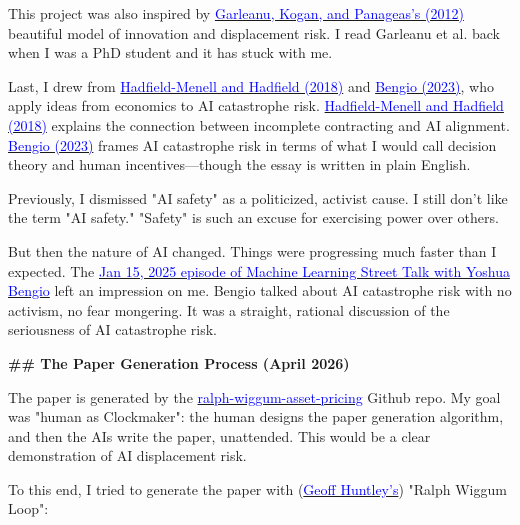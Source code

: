 \documentclass[12pt]{article}
\begin{document}
\begin{mdframed}[
linewidth=1pt,
linecolor=black,
innerleftmargin=0.25em,
innerrightmargin=0.25em,
innertopmargin=0.2\baselineskip,
innerbottommargin=0.8\baselineskip
]
This project was also inspired by \href{https://www.sciencedirect.com/science/article/abs/pii/S0304405X12000621}{\textcolor{blue}{Garleanu, Kogan, and Panageas's (2012)}} beautiful model of innovation and displacement risk. I read Garleanu et al. back when I was a PhD student and it has stuck with me.

Last, I drew from \href{https://arxiv.org/abs/1804.04268}{\textcolor{blue}{Hadfield-Menell and Hadfield (2018)}} and \href{https://www.journalofdemocracy.org/ai-and-catastrophic-risk/}{\textcolor{blue}{Bengio (2023)}}, who apply ideas from economics to AI catastrophe risk. \href{https://arxiv.org/abs/1804.04268}{\textcolor{blue}{Hadfield-Menell and Hadfield (2018)}} explains the connection between incomplete contracting and AI alignment. \href{https://www.journalofdemocracy.org/ai-and-catastrophic-risk/}{\textcolor{blue}{Bengio (2023)}} frames AI catastrophe risk in terms of what I would call decision theory and human incentives---though the essay is written in plain English.

Previously, I dismissed "AI safety" as a politicized, activist cause. I still don't like the term "AI safety." "Safety" is such an excuse for exercising power over others.

But then the nature of AI changed. Things were progressing much faster than I expected. The \href{https://podcasts.apple.com/ca/podcast/yoshua-bengio-designing-out-agency-for-safe-ai/id1510472996?i=1000684132955}{\textcolor{blue}{Jan 15, 2025 episode of Machine Learning Street Talk with Yoshua Bengio}} left an impression on me. Bengio talked about AI catastrophe risk with no activism, no fear mongering. It was a straight, rational discussion of the seriousness of AI catastrophe risk.

\par
{\large\bfseries \textcolor{red!70!black}{\#\# The Paper Generation Process (April 2026)}}
\par

The paper is generated by the \href{https://github.com/redacted/ralph-wiggum-asset-pricing/tree/main}{\textcolor{blue}{ralph-wiggum-asset-pricing}} Github repo. My goal was "human as Clockmaker": the human designs the paper generation algorithm, and then the AIs write the paper, unattended. This would be a clear demonstration of AI displacement risk.

To this end, I tried to generate the paper with (\href{https://ghuntley.com/ralph/}{\textcolor{blue}{Geoff Huntley's}}) "Ralph Wiggum Loop":


\end{mdframed}
\end{document}
